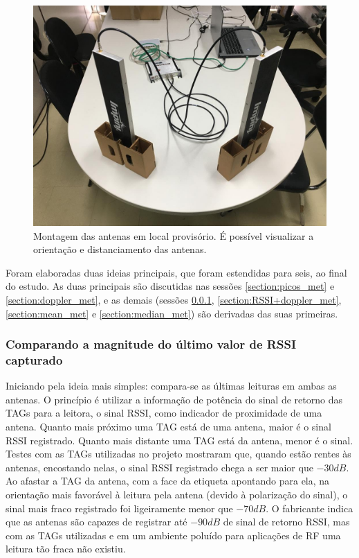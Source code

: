   \begin{figure}[H]
    \centering
    \includegraphics[width=0.6\linewidth]{figs/Metodologia/antenas1.jpeg}
    \caption{Montagem das antenas em local provisório. É possível visualizar a orientação e distanciamento das antenas.}
    \label{fig:antenas1}
\end{figure}
 
 Foram elaboradas duas ideias principais, que foram estendidas para seis, ao final do estudo. As duas principais são discutidas nas sessões \ref{section:picos_met} e \ref{section:doppler_met}, e as demais (sessões \ref{section:ultimo_valor_met}, \ref{section:RSSI+doppler_met}, \ref{section:mean_met} e \ref{section:median_met}) são derivadas das suas primeiras.

 \subsubsection{Comparando a magnitude do último valor de RSSI capturado} \label{section:ultimo_valor_met}
 
 Iniciando pela ideia mais simples: compara-se as últimas leituras em ambas as antenas. O princípio é utilizar a informação de potência do sinal de retorno das TAGs para a leitora, o sinal RSSI, como indicador de proximidade de uma antena. Quanto mais próximo uma TAG está de uma antena, maior é o sinal RSSI registrado. Quanto mais distante uma TAG está da antena, menor é o sinal. Testes com as TAGs utilizadas no projeto mostraram que, quando estão rentes às antenas, encostando nelas, o sinal RSSI registrado chega a ser maior que $-30dB$. Ao afastar a TAG da antena, com a face da etiqueta apontando para ela, na orientação mais favorável à leitura pela antena (devido à polarização do sinal), o sinal mais fraco registrado foi ligeiramente menor que $-70dB$. O fabricante indica que as antenas são capazes de registrar até $-90dB$ de sinal de retorno RSSI, mas com as TAGs utilizadas e em um ambiente poluído para aplicações de RF uma leitura tão fraca não existiu.
 

